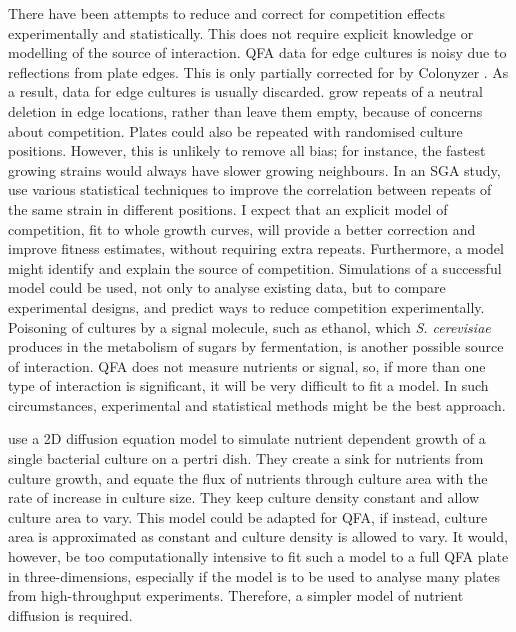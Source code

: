 There have been attempts to reduce and correct for competition effects
experimentally and statistically. This does not require explicit
knowledge or modelling of the source of interaction. QFA data for edge
cultures is noisy due to reflections from plate edges. This is only
partially corrected for by Colonyzer \citep{Lawless2010}. As a result,
data for edge cultures is usually discarded. \citet{Addinall2011} grow
repeats of a neutral deletion in edge locations, rather than leave
them empty, because of concerns about competition. Plates could also
be repeated with randomised culture positions. However, this is
unlikely to remove all bias; for instance, the fastest growing strains
would always have slower growing neighbours. In an SGA study,
\citet{Baryshnikova2010} use various statistical techniques to improve
the correlation between repeats of the same strain in different
positions. I expect that an explicit model of competition, fit to
whole growth curves, will provide a better correction and improve
fitness estimates, without requiring extra repeats. Furthermore, a
model might identify and explain the source of
competition. Simulations of a successful model could be used, not only
to analyse existing data, but to compare experimental designs, and
predict ways to reduce competition experimentally. Poisoning of
cultures by a signal molecule, such as ethanol, which
\textit{S. cerevisiae} produces in the metabolism of sugars by
fermentation, is another possible source of interaction.
QFA does not measure nutrients or signal, so, if more than one type of
interaction is significant, it will be very difficult to fit a
model. In such circumstances, experimental and statistical methods
might be the best approach.

\citet{Reo2014} use a 2D diffusion equation model to simulate nutrient
dependent growth of a single bacterial culture on a pertri dish. They
create a sink for nutrients from culture growth, and equate the flux
of nutrients through culture area with the rate of increase in culture
size. They keep culture density constant and allow culture area to
vary. This model could be adapted for QFA, if instead, culture area is
approximated as constant and culture density is allowed to vary. It
would, however, be too computationally intensive to fit such a model
to a full QFA plate in three-dimensions, especially if the model is to
be used to analyse many plates from high-throughput
experiments. Therefore, a simpler model of nutrient diffusion is
required.

